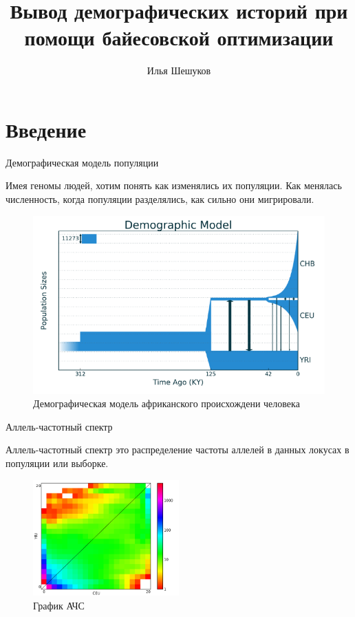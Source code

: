 \documentclass[
  russian,
  ignorenonframetext,
]{beamer}
\title{Вывод демографических историй при помощи байесовской оптимизации}
\author{Илья Шешуков}
\date{}
\begin{document}
\frame{\titlepage}

\hypertarget{ux432ux432ux435ux434ux435ux43dux438ux435}{%
\section{Введение}\label{ux432ux432ux435ux434ux435ux43dux438ux435}}

\begin{frame}{Демографическая модель популяции}
\protect\hypertarget{ux434ux435ux43cux43eux433ux440ux430ux444ux438ux447ux435ux441ux43aux430ux44f-ux43cux43eux434ux435ux43bux44c-ux43fux43eux43fux443ux43bux44fux446ux438ux438}{}

Имея геномы людей, хотим понять как изменялись их популяции. Как
менялась численность, когда популяции разделялись, как сильно они
мигрировали.

\begin{figure}
\centering
\includegraphics[width=\textwidth,height=0.4\textheight]{./pics/outofafrica.png}
\caption{Демографическая модель африканского происхождени человека}
\end{figure}

\end{frame}

\begin{frame}{Аллель-частотный спектр}
\protect\hypertarget{ux430ux43bux43bux435ux43bux44c-ux447ux430ux441ux442ux43eux442ux43dux44bux439-ux441ux43fux435ux43aux442ux440-1}{}

Аллель-частотный спектр это распределение частоты аллелей в данных
локусах в популяции или выборке.

\begin{figure}
\centering
\includegraphics[width=0.5\textwidth,height=\textheight]{./pics/sfs.png}
\caption{График АЧС}
\end{figure}

\end{frame}
\end{document}
